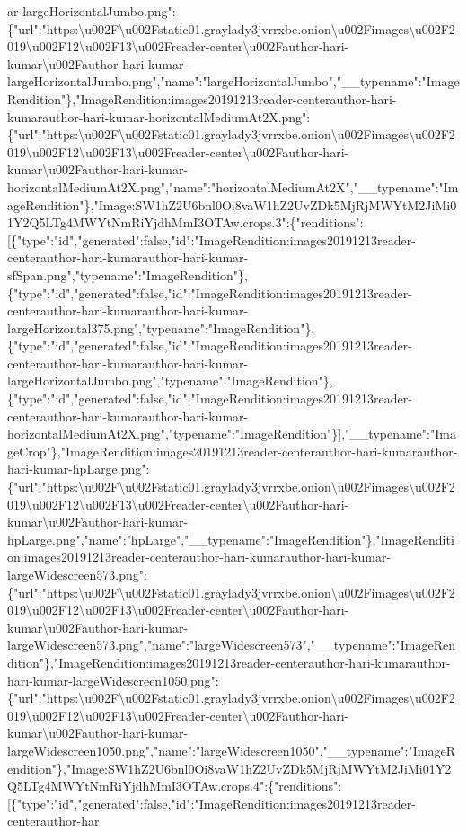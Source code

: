 ar-largeHorizontalJumbo.png":\{"url":"https:\textbackslash{}u002F\textbackslash{}u002Fstatic01.graylady3jvrrxbe.onion\textbackslash{}u002Fimages\textbackslash{}u002F2019\textbackslash{}u002F12\textbackslash{}u002F13\textbackslash{}u002Freader-center\textbackslash{}u002Fauthor-hari-kumar\textbackslash{}u002Fauthor-hari-kumar-largeHorizontalJumbo.png","name":"largeHorizontalJumbo","\_\_typename":"ImageRendition"\},"ImageRendition:images20191213reader-centerauthor-hari-kumarauthor-hari-kumar-horizontalMediumAt2X.png":\{"url":"https:\textbackslash{}u002F\textbackslash{}u002Fstatic01.graylady3jvrrxbe.onion\textbackslash{}u002Fimages\textbackslash{}u002F2019\textbackslash{}u002F12\textbackslash{}u002F13\textbackslash{}u002Freader-center\textbackslash{}u002Fauthor-hari-kumar\textbackslash{}u002Fauthor-hari-kumar-horizontalMediumAt2X.png","name":"horizontalMediumAt2X","\_\_typename":"ImageRendition"\},"Image:SW1hZ2U6bnl0Oi8vaW1hZ2UvZDk5MjRjMWYtM2JiMi01Y2Q5LTg4MWYtNmRiYjdhMmI3OTAw.crops.3":\{"renditions":{[}\{"type":"id","generated":false,"id":"ImageRendition:images20191213reader-centerauthor-hari-kumarauthor-hari-kumar-sfSpan.png","typename":"ImageRendition"\},\{"type":"id","generated":false,"id":"ImageRendition:images20191213reader-centerauthor-hari-kumarauthor-hari-kumar-largeHorizontal375.png","typename":"ImageRendition"\},\{"type":"id","generated":false,"id":"ImageRendition:images20191213reader-centerauthor-hari-kumarauthor-hari-kumar-largeHorizontalJumbo.png","typename":"ImageRendition"\},\{"type":"id","generated":false,"id":"ImageRendition:images20191213reader-centerauthor-hari-kumarauthor-hari-kumar-horizontalMediumAt2X.png","typename":"ImageRendition"\}{]},"\_\_typename":"ImageCrop"\},"ImageRendition:images20191213reader-centerauthor-hari-kumarauthor-hari-kumar-hpLarge.png":\{"url":"https:\textbackslash{}u002F\textbackslash{}u002Fstatic01.graylady3jvrrxbe.onion\textbackslash{}u002Fimages\textbackslash{}u002F2019\textbackslash{}u002F12\textbackslash{}u002F13\textbackslash{}u002Freader-center\textbackslash{}u002Fauthor-hari-kumar\textbackslash{}u002Fauthor-hari-kumar-hpLarge.png","name":"hpLarge","\_\_typename":"ImageRendition"\},"ImageRendition:images20191213reader-centerauthor-hari-kumarauthor-hari-kumar-largeWidescreen573.png":\{"url":"https:\textbackslash{}u002F\textbackslash{}u002Fstatic01.graylady3jvrrxbe.onion\textbackslash{}u002Fimages\textbackslash{}u002F2019\textbackslash{}u002F12\textbackslash{}u002F13\textbackslash{}u002Freader-center\textbackslash{}u002Fauthor-hari-kumar\textbackslash{}u002Fauthor-hari-kumar-largeWidescreen573.png","name":"largeWidescreen573","\_\_typename":"ImageRendition"\},"ImageRendition:images20191213reader-centerauthor-hari-kumarauthor-hari-kumar-largeWidescreen1050.png":\{"url":"https:\textbackslash{}u002F\textbackslash{}u002Fstatic01.graylady3jvrrxbe.onion\textbackslash{}u002Fimages\textbackslash{}u002F2019\textbackslash{}u002F12\textbackslash{}u002F13\textbackslash{}u002Freader-center\textbackslash{}u002Fauthor-hari-kumar\textbackslash{}u002Fauthor-hari-kumar-largeWidescreen1050.png","name":"largeWidescreen1050","\_\_typename":"ImageRendition"\},"Image:SW1hZ2U6bnl0Oi8vaW1hZ2UvZDk5MjRjMWYtM2JiMi01Y2Q5LTg4MWYtNmRiYjdhMmI3OTAw.crops.4":\{"renditions":{[}\{"type":"id","generated":false,"id":"ImageRendition:images20191213reader-centerauthor-har